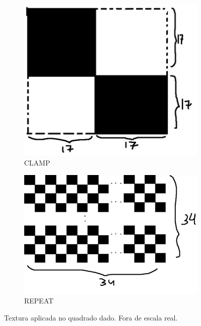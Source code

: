 \documentclass{article}
\begin{document}
\begin{figure}[ht!]
	\centering
	\begin{subfigure}{.4\textwidth}
		\centering
		\includegraphics[width=0.8\linewidth]{img/clamp}
		\caption{CLAMP}
		\label{fig:clamp}
	\end{subfigure}
	\begin{subfigure}{.4\textwidth}
		\centering
		\includegraphics[width=0.9\linewidth]{img/repeat}
		\caption{REPEAT}
		\label{fig:repeat}
	\end{subfigure}
\caption{Textura aplicada no quadrado dado. Fora de escala real.}
\end{figure}
\end{document}
